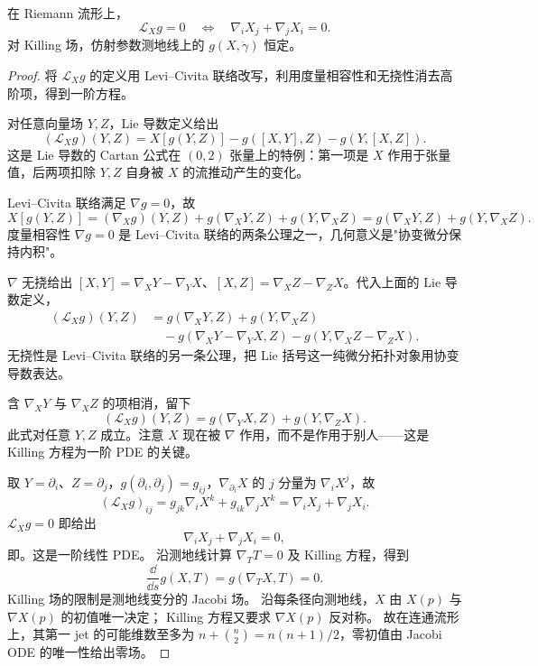 \begin{proposition}
在 Riemann 流形上，\[\mathcal L_Xg=0\quad\Longleftrightarrow\quad\nabla_iX_j+\nabla_jX_i=0.\]对 Killing 场，仿射参数测地线上的 $g(X,\dot\gamma)$ 恒定。
\end{proposition}

\begin{proof}
将 $\mathcal L_Xg$ 的定义用 Levi--Civita 联络改写，利用度量相容性和无挠性消去高阶项，得到一阶方程。

对任意向量场 $Y,Z$，Lie 导数定义给出
\begin{equation*}
 (\mathcal L_Xg)(Y,Z)
 =X[g(Y,Z)]-g([X,Y],Z)-g(Y,[X,Z]).
\end{equation*}
这是 Lie 导数的 Cartan 公式在 $(0,2)$ 张量上的特例：第一项是 $X$ 作用于张量值，后两项扣除 $Y,Z$ 自身被 $X$ 的流推动产生的变化。

Levi--Civita 联络满足 $\nabla g=0$，故
\begin{equation*}
 X[g(Y,Z)]
 =(\nabla_Xg)(Y,Z)+g(\nabla_XY,Z)+g(Y,\nabla_XZ)
 =g(\nabla_XY,Z)+g(Y,\nabla_XZ).
\end{equation*}
度量相容性 $\nabla g=0$ 是 Levi--Civita 联络的两条公理之一，几何意义是"协变微分保持内积"。

$\nabla$ 无挠给出 $[X,Y]=\nabla_XY-\nabla_YX$、$[X,Z]=\nabla_XZ-\nabla_ZX$。代入上面的 Lie 导数定义，
\begin{align*}
 (\mathcal L_Xg)(Y,Z)
 &=g(\nabla_XY,Z)+g(Y,\nabla_XZ)\\
 &\quad -g(\nabla_XY-\nabla_YX,Z)-g(Y,\nabla_XZ-\nabla_ZX).
\end{align*}
无挠性是 Levi--Civita 联络的另一条公理，把 Lie 括号这一纯微分拓扑对象用协变导数表达。

含 $\nabla_XY$ 与 $\nabla_XZ$ 的项相消，留下
\begin{equation*}
 (\mathcal L_Xg)(Y,Z)
 =g(\nabla_YX,Z)+g(Y,\nabla_ZX).
\end{equation*}
此式对任意 $Y,Z$ 成立。注意 $X$ 现在被 $\nabla$ 作用，而不是作用于别人——这是 Killing 方程为一阶 PDE 的关键。

取 $Y=\partial_i$、$Z=\partial_j$，$g(\partial_i,\partial_j)=g_{ij}$，$\nabla_{\partial_i}X$ 的 $j$ 分量为 $\nabla_iX^j$，故
\begin{equation*}
 (\mathcal L_Xg)_{ij}
 =g_{jk}\nabla_iX^k+g_{ik}\nabla_jX^k
 =\nabla_iX_j+\nabla_jX_i.
\end{equation*}
$\mathcal L_Xg=0$ 即给出
\begin{equation}\label{eq:math-dg-synthesis-killing-eq}
\boxed{\nabla_iX_j+\nabla_jX_i=0,}
\end{equation}
即。这是一阶线性 PDE。
沿测地线计算 $\nabla_TT=0$ 及 Killing 方程，得到
\[
\frac{\dd}{\dd s}g(X,T)=g(\nabla_TX,T)=0.
\]
Killing 场的限制是测地线变分的 Jacobi 场。
沿每条径向测地线，$X$ 由 $X(p)$ 与 $\nabla X(p)$ 的初值唯一决定；
Killing 方程又要求 $\nabla X(p)$ 反对称。
故在连通流形上，其第一 jet 的可能维数至多为
$n+\binom n2=n(n+1)/2$，零初值由 Jacobi ODE 的唯一性给出零场。




\end{proof}
